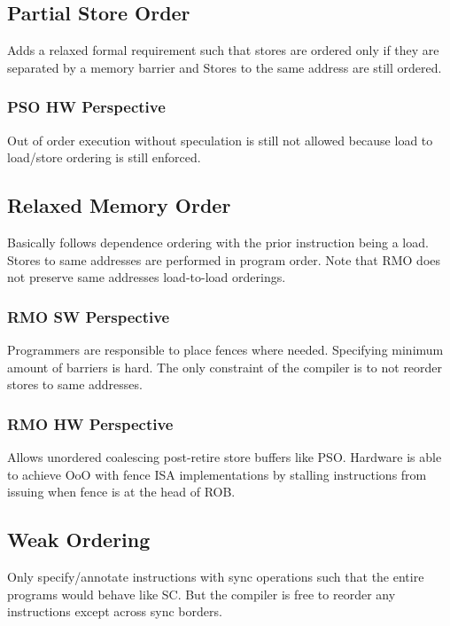\documentclass{article}
\begin{document}
\begin{multicols*}{2}
\subsection{Partial Store Order}
Adds a relaxed formal requirement such that stores are ordered only if they are separated by
a memory barrier and Stores to the same address are still ordered.

\subsubsection{PSO HW Perspective}
Out of order execution without speculation is still not allowed because load to load/store ordering is still enforced.

\subsection{Relaxed Memory Order}
Basically follows dependence ordering with the prior instruction being a load. Stores to same addresses are performed in program order. Note that RMO does not preserve same addresses load-to-load orderings.

\subsubsection{RMO SW Perspective}
Programmers are responsible to place fences where needed. Specifying minimum amount of barriers is hard. The only constraint of the compiler is to not reorder stores to same addresses.

\subsubsection{RMO HW Perspective}
Allows unordered coalescing post-retire store buffers like PSO. Hardware is able to achieve OoO with fence ISA implementations by stalling instructions from issuing when fence is at the head of ROB.

\subsection{Weak Ordering}
Only specify/annotate instructions with sync operations such that the entire programs would behave like SC. But the compiler is free to reorder any instructions except across sync borders.


\end{multicols*}
\end{document}

